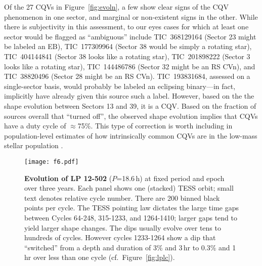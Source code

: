 \documentclass[11pt,twocolumn,tighten]{aastex63}
\begin{document}
Of the 27 CQVs in Figure~\ref{fig:evoln}, a few show clear signs of
the CQV phenomenon in one sector, and marginal or non-existent signs
in the other.  While there is subjectivity in this assessment, to our
eyes cases for which at least one sector would be flagged as
``ambiguous'' include
TIC~368129164 (Sector 23 might be labeled an EB),
TIC~177309964 (Sector 38 would be simply a rotating star),
TIC~404144841 (Sector 38 looks like a rotating star),
TIC~201898222 (Sector 3 looks like a rotating star),
TIC~144486786 (Sector 32 might be an RS CVn),
and
TIC~38820496 (Sector 28 might be an RS CVn).
TIC~193831684, assessed on a single-sector basis, would probably be
labeled an eclipsing binary---in fact, \citet{2021ApJ...912..123J}
implicitly have already given this source such a label.  However,
based on the the shape evolution between Sectors 13 and 39, it is a
CQV.  Based on the fraction of sources overall that ``turned off'',
the observed shape evolution implies that CQVs have a duty cycle of
$\approx$75\%.  This type of correction is worth including in
population-level estimates of how intrinsically common CQVs are in the
low-mass stellar population \citep[e.g.][]{2022AJ....163..144G}.



\begin{figure*}[!t]
	\begin{center}
		\centering
		\texttt{[image: f6.pdf]}
		\vspace{-0.3cm}
		\caption{
			{\bf Evolution of LP 12-502} ($P$=18.6\,h) at fixed period and
			epoch over three years.  Each panel shows one (stacked) TESS
			orbit; small text denotes relative cycle number.  There are 200
			binned black points per cycle.  The TESS pointing law dictates
			the large time gaps between Cycles 64-248, 315-1233, and
			1264-1410; larger gaps tend to yield larger shape changes.  The
			dips usually evolve over tens to hundreds of cycles.  However
			cycles 1233-1264 show a dip that ``switched'' from a depth and
			duration of 3\% and 3\,hr to 0.3\% and 1\,hr over less than one
			cycle (cf.~Figure~\ref{fig:lplc}).
		}
		\label{fig:lp}
	\end{center}
\end{figure*}
\end{document}
